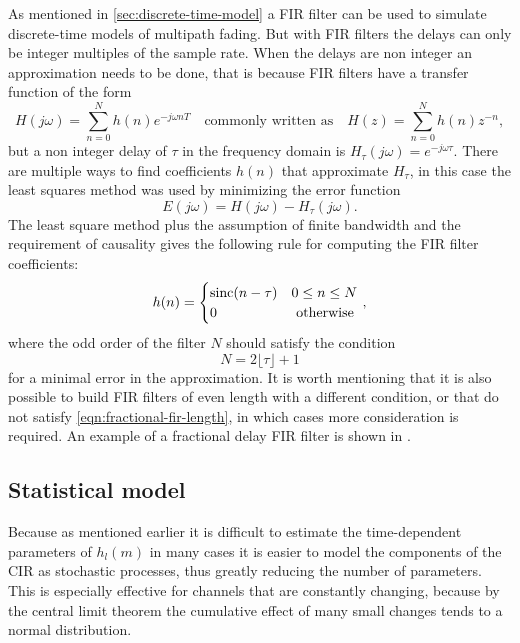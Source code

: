 As mentioned in \ref{sec:discrete-time-model} a FIR filter can be used to simulate discrete-time models of multipath fading. But with FIR filters the delays can only be integer multiples of the sample rate. When the delays are non integer an approximation needs to be done, that is because FIR filters have a transfer function of the form
\begin{equation} \label{eqn:transfer-function-fir}
	H(j\omega) = \sum_{n = 0}^{N} h(n) e^{-j\omega nT}
	\quad \text{commonly written as} \quad
	H(z) = \sum_{n = 0}^{N} h(n) z^{-n},
\end{equation}
but a non integer delay of \(\tau\) in the frequency domain is \(H_\tau(j\omega) = e^{-j\omega \tau}\). There are multiple ways to find coefficients \(h(n)\) that approximate \(H_\tau\), in this case the least squares method was used by minimizing the error function
\begin{equation}
	E(j\omega) = H(j\omega) - H_\tau(j\omega).
\end{equation}
The least square method plus the assumption of finite bandwidth and the requirement of causality gives the following rule for computing the FIR filter coefficients:
\begin{equation}
	h(n)= \begin{cases}
		\operatorname{sinc} (n - \tau) & 0 \leq n \leq N \\ 
		0 & \text { otherwise }
	\end{cases},
\end{equation}
where the odd order of the filter \(N\) should satisfy the condition
\begin{equation} \label{eqn:fractional-fir-length}
	N = 2 \lfloor \tau \rfloor + 1
\end{equation}
for a minimal error in the approximation. It is worth mentioning that it is also possible to build FIR filters of even length with a different condition, or that do not satisfy \eqref{eqn:fractional-fir-length}, in which cases more consideration is required. An example of a fractional delay FIR filter is shown in .

\subsection{Statistical model} \label{sec:statistical-model}
Because as mentioned earlier it is difficult to estimate the time-dependent parameters of \(h_l(m)\) in many cases it is easier to model the components of the CIR as stochastic processes, thus greatly reducing the number of parameters. This is especially effective for channels that are constantly changing, because by the central limit theorem the cumulative effect of many small changes tends to a normal distribution.

